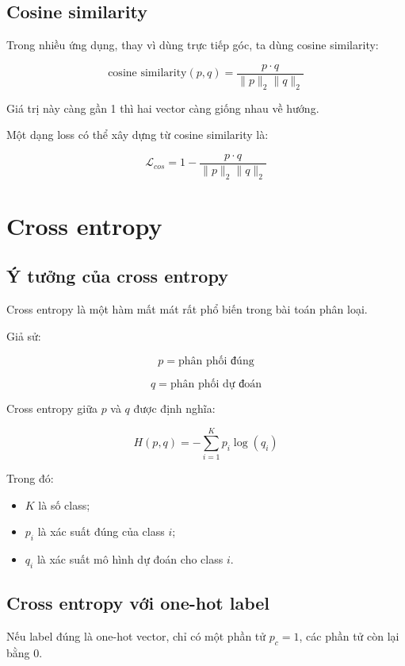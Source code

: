 \documentclass[12pt,a4paper]{report}
\begin{document}
\section{Cosine similarity}

Trong nhiều ứng dụng, thay vì dùng trực tiếp góc, ta dùng cosine similarity:

\[
    \text{cosine similarity}(p,q)
    =
    \frac{p \cdot q}{\|p\|_2\|q\|_2}
\]

Giá trị này càng gần 1 thì hai vector càng giống nhau về hướng.

Một dạng loss có thể xây dựng từ cosine similarity là:

\[
    \mathcal{L}_{cos} = 1 -
    \frac{p \cdot q}{\|p\|_2\|q\|_2}
\]

\chapter{Cross entropy}

\section{Ý tưởng của cross entropy}

Cross entropy là một hàm mất mát rất phổ biến trong bài toán phân loại.

Giả sử:

\[
    p = \text{phân phối đúng}
\]

\[
    q = \text{phân phối dự đoán}
\]

Cross entropy giữa $p$ và $q$ được định nghĩa:

\[
    H(p,q) = -\sum_{i=1}^{K} p_i \log(q_i)
\]

Trong đó:

\begin{itemize}
    \item $K$ là số class;
    \item $p_i$ là xác suất đúng của class $i$;
    \item $q_i$ là xác suất mô hình dự đoán cho class $i$.
\end{itemize}

\section{Cross entropy với one-hot label}

Nếu label đúng là one-hot vector, chỉ có một phần tử $p_c=1$, các phần tử còn lại bằng 0.
\end{document}
